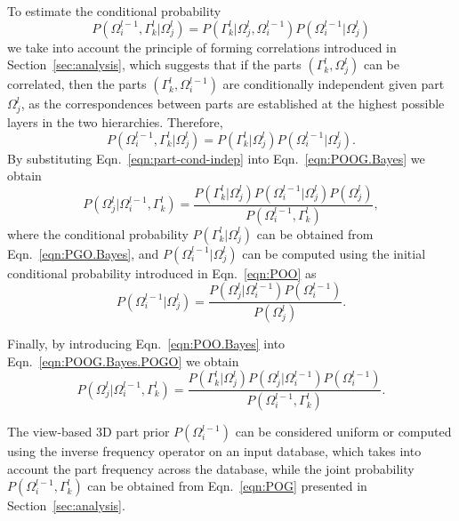\documentclass[runningheads]{llncs}
\begin{document}
To estimate the conditional probability
\begin{equation}
 P(\Omega_i^{l-1},\Gamma_k^l \vert \Omega_j^{l}) =  P(\Gamma_k^l \vert \Omega_j^{l},\Omega_i^{l-1}) P(\Omega_i^{l-1} \vert \Omega_j^{l})
\end{equation}
we take into account the principle of forming correlations introduced in Section~\ref{sec:analysis}, which suggests that if the parts $(\Gamma_k^l,\Omega_j^{l})$ can be correlated, then the parts $(\Gamma_k^l,\Omega_i^{l-1})$ are conditionally independent given part $\Omega_j^{l}$, as the correspondences between parts are established at the highest possible layers in the two hierarchies. Therefore,
\begin{equation}
  P(\Omega_i^{l-1},\Gamma_k^l \vert \Omega_j^{l}) =  P(\Gamma_k^l \vert \Omega_j^{l}) P(\Omega_i^{l-1} \vert \Omega_j^{l}).
  \label{eqn:part-cond-indep}
\end{equation}
By substituting Eqn.~\ref{eqn:part-cond-indep} into Eqn.~\ref{eqn:POOG.Bayes} we obtain
\begin{equation}
  P(\Omega_j^{l} \vert \Omega_i^{l-1},\Gamma_k^l) = \frac{P(\Gamma_k^l \vert \Omega_j^{l})P(\Omega_i^{l-1} \vert \Omega_j^{l})P(\Omega_j^{l})}{P(\Omega_i^{l-1},\Gamma_k^l)},
  \label{eqn:POOG.Bayes.POGO}
\end{equation}
where the conditional probability $P(\Gamma_k^l \vert \Omega_j^l)$ can be obtained from Eqn.~\ref{eqn:PGO.Bayes}, and $P(\Omega_i^{l-1} \vert \Omega_j^{l})$ can be computed using the initial conditional probability introduced in Eqn.~\ref{eqn:POO} as
\begin{equation}
  P(\Omega_i^{l-1} \vert \Omega_j^{l}) = \frac{P(\Omega_j^{l}\vert \Omega_i^{l-1})P(\Omega_i^{l-1})}{P(\Omega_j^{l})}.
  \label{eqn:POO.Bayes}
 \end{equation}

Finally, by introducing Eqn.~\ref{eqn:POO.Bayes} into Eqn.~\ref{eqn:POOG.Bayes.POGO} we obtain
\begin{equation}
 P(\Omega_j^{l} \vert \Omega_i^{l-1},\Gamma_k^l) = \frac{P(\Gamma_k^l \vert \Omega_j^{l})P(\Omega_j^{l} \vert \Omega_i^{l-1})P(\Omega_i^{l-1})}{P(\Omega_i^{l-1},\Gamma_k^l)}.
\end{equation}
  
The view-based 3D part prior $P(\Omega_i^{l-1})$ can be considered uniform or computed using the inverse frequency operator on an input database, which takes into account the part frequency across the database, while the joint probability $P(\Omega_i^{l-1},\Gamma_k^l)$ can be obtained from Eqn.~\ref{eqn:POG} presented in Section~\ref{sec:analysis}.
\end{document}
